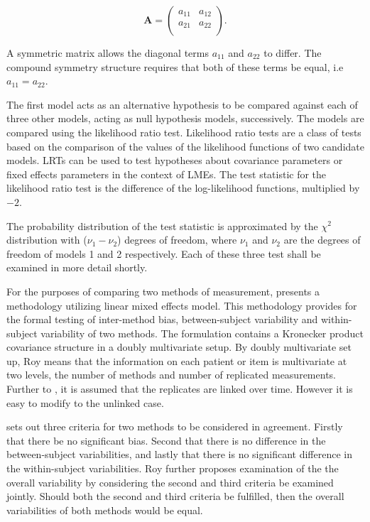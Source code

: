 \documentclass[12pt, a4paper]{report}
\theoremstyle{plain}
\theoremstyle{definition}
\theoremstyle{remark}
\begin{document}
	\[
	\boldsymbol{A} = \left( \begin{array}{cc}
	a_{11} & a_{12}  \\
	a_{21} & a_{22}  \\
	\end{array}\right).
	\]
	
A symmetric matrix allows the diagonal terms $a_{11}$ and $a_{22}$ to differ. The compound symmetry structure requires that both of these terms be equal, i.e $a_{11} = a_{22}$.
	
The first model acts as an alternative hypothesis to be compared against each of three other models, acting as null hypothesis models, successively. The models are compared using the likelihood ratio test. Likelihood ratio tests are a class of tests based on the comparison of the values of the likelihood functions of two candidate models. LRTs can be used to test hypotheses about covariance parameters or fixed effects parameters in the context of LMEs. The test statistic for the likelihood ratio test is the difference of the log-likelihood functions, multiplied by $-2$.
	
The probability distribution of the test statistic is approximated by the $\chi^2$ distribution with ($\nu_{1} - \nu_{2}$) degrees of freedom, where $\nu_{1}$ and $\nu_{2}$ are the degrees of freedom of models 1 and 2 respectively. Each of these three test shall be examined in more detail shortly.
		
For the purposes of comparing two methods of measurement, \citet{ARoy2009} presents a methodology utilizing linear mixed effects model. This methodology provides for the formal testing of inter-method bias, between-subject variability and within-subject variability of two methods. The formulation contains a Kronecker product covariance structure in a doubly multivariate setup. By doubly multivariate set up, Roy means that the information on each patient or item is multivariate at two levels, the number of methods and number of replicated measurements. Further to \citet{lam}, it is assumed that the replicates are linked over time. However it is easy to modify to the unlinked case.
	
\citet{ARoy2009} sets out three criteria for two methods to be considered in agreement. Firstly that there be no significant bias. Second that there is no difference in the between-subject variabilities, and lastly that there is no significant difference in the within-subject variabilities. Roy further proposes examination of the the overall variability by considering the second and third criteria be examined jointly. Should both the second and third criteria be fulfilled, then the overall variabilities of both methods would be equal.	
\end{document}
